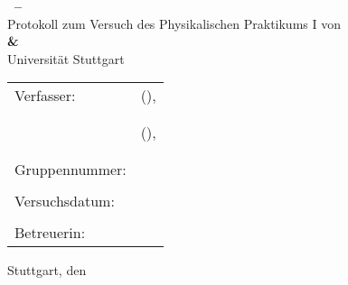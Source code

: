 \begin{titlepage}

	\begin{center}
		\Huge{\textbf{\VERSUCHSNR\ -- \VERSUCHSNAME}}\\
		\vspace{10mm}
		\Large{Protokoll zum Versuch des Physikalischen Praktikums I von \\ \textbf{\VerfasserEINS\;\& \VerfasserZWEI}}\\
		\vspace{10mm}
		\Large{Universität Stuttgart}\\
	\end{center}
	\vspace{1cm}
	\begin{center}
		\begin{tabular}{ll}
			\large{Verfasser:}		& \large{\VerfasserEINS\;(\StudiengangEINS),} \\
			& \large{\MatNoEINS} \\
			\vspace{0cm}\\
			& \large{\VerfasserZWEI\;(\StudiengangZWEI),} \\
			& \large{\MatNoZWEI} \\
			\vspace{0cm}\\
			\large{Gruppennummer:}	& \large{\GRUPPENNR} \\
			\vspace{0cm}\\
			\large{Versuchsdatum:}	& \large{\VERSUCHSDATUM} \\
			\vspace{0cm}\\
			\large{Betreuerin:}		& \large{\BETREUER}
		\end{tabular}
	\end{center}
	\vspace{15mm}

	\begin{center}
		Stuttgart, den \PROTOKOLLDATUM
	\end{center}

\end{titlepage}